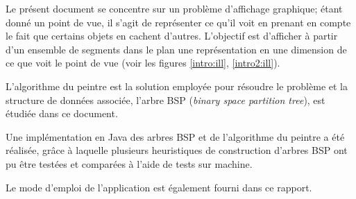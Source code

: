Le présent document se concentre sur un problème d'affichage graphique;
étant donné un point de vue, il s'agit de représenter ce qu'il voit en
prenant en compte le fait que certains objets en cachent d'autres.
L'objectif est d'afficher à partir d'un ensemble de segments dans le
plan une représentation en une dimension de ce que voit le point de vue
(voir les figures
\ref{intro:ill}, \ref{intro2:ill}).

L'algorithme du peintre est la solution employée pour résoudre le problème et
la structure de données associée, l'arbre BSP
(\emph{binary space partition tree}), est étudiée dans ce document.

Une implémentation en Java des arbres BSP et de l'algorithme
du peintre a été réalisée, grâce à laquelle plusieurs
heuristiques de construction d'arbres BSP ont pu être testées et
comparées à l'aide de tests sur machine.

Le mode d'emploi de l'application est également fourni dans ce rapport.



